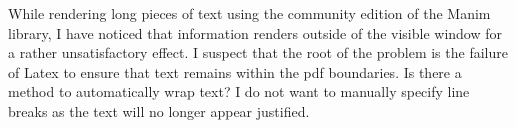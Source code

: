 \documentclass[preview]{standalone}
\begin{document}
\begin{center}
While rendering long pieces of text using the community edition of the Manim library, I have noticed that information renders outside of the visible window for a rather unsatisfactory effect. I suspect that the root of the problem is the failure of Latex to ensure that text remains within the pdf boundaries. Is there a method to automatically wrap text? I do not want to manually specify line breaks as the text will no longer appear justified.
\end{center}
\end{document}

